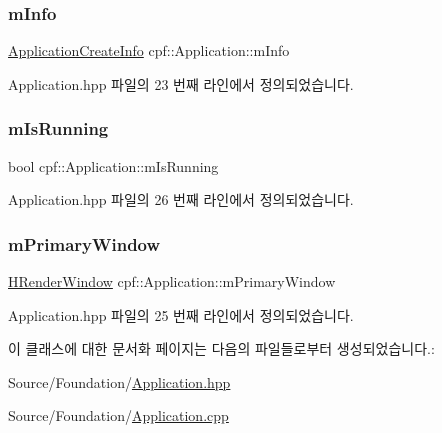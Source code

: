 \subsubsection{\texorpdfstring{m\+Info}{mInfo}}
{\footnotesize\ttfamily \hyperlink{structcpf_1_1_application_create_info}{Application\+Create\+Info} cpf\+::\+Application\+::m\+Info\hspace{0.3cm}{\ttfamily [protected]}}



Application.\+hpp 파일의 23 번째 라인에서 정의되었습니다.

\mbox{\label{classcpf_1_1_application_a84a6e2bafcc39719acee9885a064ac75}} 
\subsubsection{\texorpdfstring{m\+Is\+Running}{mIsRunning}}
{\footnotesize\ttfamily bool cpf\+::\+Application\+::m\+Is\+Running\hspace{0.3cm}{\ttfamily [protected]}}



Application.\+hpp 파일의 26 번째 라인에서 정의되었습니다.

\mbox{\label{classcpf_1_1_application_a112167287be2ff0ee64a793c6a93fa3d}} 
\subsubsection{\texorpdfstring{m\+Primary\+Window}{mPrimaryWindow}}
{\footnotesize\ttfamily \hyperlink{namespacecpf_af5ffcc39bb6465427fc3b91366c917f6}{H\+Render\+Window} cpf\+::\+Application\+::m\+Primary\+Window\hspace{0.3cm}{\ttfamily [protected]}}



Application.\+hpp 파일의 25 번째 라인에서 정의되었습니다.



이 클래스에 대한 문서화 페이지는 다음의 파일들로부터 생성되었습니다.\+:\begin{DoxyCompactItemize}
\item 
Source/\+Foundation/\hyperlink{_application_8hpp}{Application.\+hpp}\item 
Source/\+Foundation/\hyperlink{_application_8cpp}{Application.\+cpp}\end{DoxyCompactItemize}
